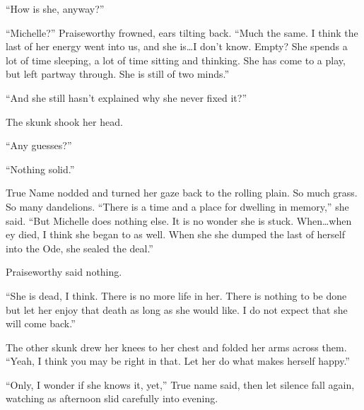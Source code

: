 ``How is she, anyway?''

``Michelle?'' Praiseworthy frowned, ears tilting back. ``Much the same. I think the last of her energy went into us, and she is\ldots I don't know. Empty? She spends a lot of time sleeping, a lot of time sitting and thinking. She has come to a play, but left partway through. She is still of two minds.''

``And she still hasn't explained why she never fixed it?''

The skunk shook her head.

``Any guesses?''

``Nothing solid.''

True Name nodded and turned her gaze back to the rolling plain. So much grass. So many dandelions. ``There is a time and a place for dwelling in memory,'' she said. ``But Michelle does nothing else. It is no wonder she is stuck. When\ldots when ey died, I think she began to as well. When she she dumped the last of herself into the Ode, she sealed the deal.''

Praiseworthy said nothing.

``She is dead, I think. There is no more life in her. There is nothing to be done but let her enjoy that death as long as she would like. I do not expect that she will come back.''

The other skunk drew her knees to her chest and folded her arms across them. ``Yeah, I think you may be right in that. Let her do what makes herself happy.''

``Only, I wonder if she knows it, yet,'' True name said, then let silence fall again, watching as afternoon slid carefully into evening.
